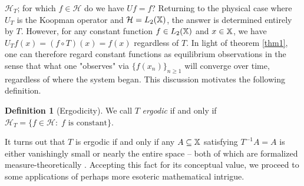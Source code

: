 \documentclass[11pt]{report}
\newcommand{\mc}[1]{\mathcal{#1}}
\theoremstyle{definition}
\newtheorem{definition}{Definition}
\begin{document}
    $\mc{H}_T$; for which $f\in\mc{H}$ do we have $Uf=f$? Returning to the
    physical case where $U_T$ is the Koopman operator and $\mc{H}=L_2(\mbb{X})$,
    the answer is determined entirely by $T$. However, for any constant function
    $f\in L_2(\mathbb{X})$ and $x\in\mathbb{X}$, we have $U_Tf(x)=(f\circ T)(x)=f(x)$
    regardless of $T$. In light of theorem \ref{thm1}, one can therefore regard
    constant functions as equilibrium observations in the sense that what one
    "observes" via $\{f(x_n)\}_{n\geq 1}$ will converge over time, regardless of
    where the system began. This discussion motivates the following definition.
    \begin{definition}[Ergodicity]\label{def2} We call $T$ \textit{ergodic} if
        and only if $\mc{H}_T=\{f\in\mc{H}:\;\text{$f$ is constant}\}$.
    \end{definition}
    It turns out that $T$ is ergodic if and only if any $A\subseteq\mathbb{X}$
    satisfying $T^{-1}A=A$ is either vanishingly small or nearly the entire
    space -- both of which are formalized measure-theoretically \cite[$\S$II.5,
    p.59]{Reed_Simon_1972}. Accepting this fact for its conceptual value, we
    proceed to some applications of perhaps more esoteric mathematical intrigue.
\end{document}
